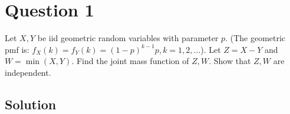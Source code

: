 \section*{Question 1}

Let \( X, Y \) be iid geometric random variables with parameter \( p \).
(The geometric pmf is: \( f_{X}(k)=f_{Y}(k)={(1-p)}^{k-1} p, k=1,2, \dots \)).
Let \( Z=X-Y \) and \( W=\min (X, Y) \).
Find the joint mass function of \( Z, W \).
Show that \( Z, W \) are independent.

\subsection*{Solution}
